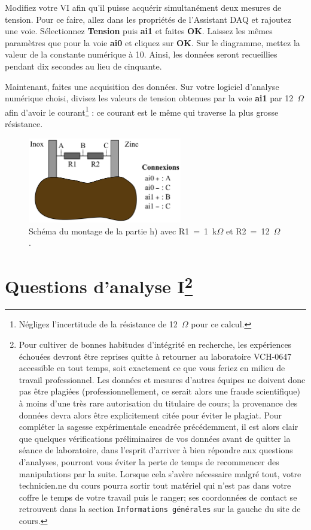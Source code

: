 \documentclass[canadien,12pt,oneside,letterpaper]{article}
\begin{document}
Modifiez votre VI afin qu'il puisse acquérir simultanément deux mesures de tension. Pour ce faire, allez dans les propriétés de l'Assistant DAQ et rajoutez une voie. Sélectionnez \textbf{Tension} puis \textbf{ai1} et faites \textbf{OK}. Laissez les mêmes paramètres que pour la voie \textbf{ai0} et cliquez sur \textbf{OK}. Sur le diagramme, mettez la valeur de la constante numérique à 10. Ainsi, les données seront recueillies pendant dix secondes au lieu de cinquante.

Maintenant, faites une acquisition des données. Sur votre logiciel d'analyse numérique choisi, divisez les valeurs de tension obtenues par la voie \textbf{ai1} par 12~$\Omega$ afin d'avoir le courant\footnote{Négligez l'incertitude de la résistance de 12~$\Omega$ pour ce calcul.} : ce courant est le même qui traverse la plus grosse résistance.

\begin{figure}[h]
\centering
\includegraphics[width=0.6\textwidth]{L1-sch-patate}
\caption{\label{L1-sch-patate}Schéma du montage de la partie h) avec R1~=~1~k$\Omega$ et R2~=~12~$\Omega$.}
\end{figure}

\vspace{-0.5cm}
\section[Questions d'analyse I]{Questions d'analyse I\footnote{Pour cultiver de bonnes habitudes d'intégrité en recherche, les expériences échouées devront être reprises quitte à retourner au laboratoire VCH-0647 accessible en tout temps, soit exactement ce que vous feriez en milieu de travail professionnel. Les données et mesures d'autres équipes ne doivent donc pas être plagiées (professionnellement, ce serait alors une fraude scientifique) à moins d'une très rare autorisation du titulaire de cours; la provenance des données devra alors être explicitement citée pour éviter le plagiat. Pour compléter la sagesse expérimentale encadrée précédemment, il est alors clair que quelques vérifications préliminaires de vos données avant de quitter la séance de laboratoire, dans l'esprit d'arriver à bien répondre aux questions d'analyses, pourront vous éviter la perte de temps de recommencer des manipulations par la suite. Lorsque cela s'avère nécessaire malgré tout, votre technicien.ne du cours pourra sortir tout matériel qui n'est pas dans votre coffre le temps de votre travail puis le ranger; ses coordonnées de contact se retrouvent dans la section \texttt{Informations générales} sur la gauche du site de cours.}} \label{sec:grade} 
\end{document}
